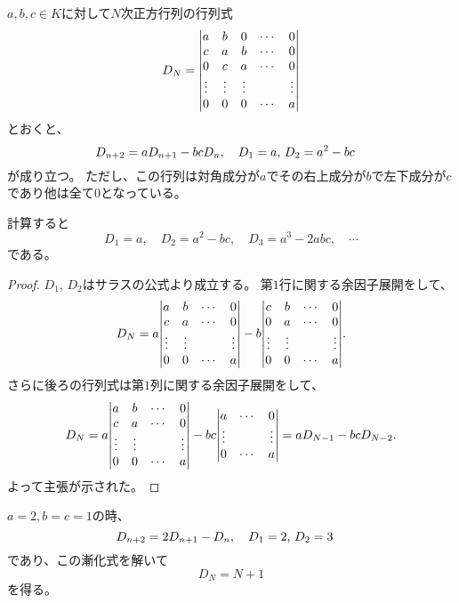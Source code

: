 \begin{proposition}[三重対角行列]
$a, b, c \in K$に対して$N$次正方行列の行列式
$$
D_N =
\mqty|
a & b & 0 & \cdots & 0 \\
c & a & b & \cdots & 0 \\
0 & c & a & \cdots & 0 \\
\vdots & \vdots & \vdots & & \vdots \\
0 & 0 & 0 & \cdots & a \\
|
$$
とおくと、
$$
D_{n+2} = a D_{n+1}-b c D_n, \qq{$D_1 = a$, $D_2 = a^2-b c$}
$$
が成り立つ。
ただし、この行列は対角成分が$a$でその右上成分が$b$で左下成分が$c$であり他は全て$0$となっている。
\end{proposition}

\begin{remark}
計算すると
$$
D_1 = a,
\quad D_2 = a^2-b c,
\quad D_3 = a^3-2 a b c,
\quad \cdots
$$
である。
\end{remark}

\begin{proof}
$D_1$, $D_2$はサラスの公式より成立する。
第$1$行に関する余因子展開をして、
$$
D_N =
a
\mqty|
a & b & \cdots & 0 \\
c & a & \cdots & 0 \\
\vdots & \vdots & & \vdots \\
0 & 0 & \cdots & a \\
|
-b
\mqty|
c & b & \cdots & 0 \\
0 & a & \cdots & 0 \\
\vdots & \vdots & & \vdots \\
0 & 0 & \cdots & a \\
|.
$$
さらに後ろの行列式は第$1$列に関する余因子展開をして、
$$
D_N =
a
\mqty|
a & b & \cdots & 0 \\
c & a & \cdots & 0 \\
\vdots & \vdots & & \vdots \\
0 & 0 & \cdots & a \\
|
-b c
\mqty|
a & \cdots & 0 \\
\vdots & & \vdots \\
0 & \cdots & a \\
|
= a D_{N-1}-b c D_{N-2}.
$$
よって主張が示された。
\end{proof}

\begin{example}
$a = 2, b = c = 1$の時、
$$
D_{n+2} = 2 D_{n+1}-D_n, \qq{$D_1 = 2$, $D_2 = 3$}
$$
であり、この漸化式を解いて
$$
D_N = N+1
$$
を得る。
\end{example}

